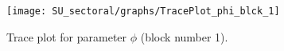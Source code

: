 \begin{figure}[H]
\centering
  \texttt{[image: SU\_sectoral/graphs/TracePlot\_phi\_blck\_1]}\\
    \caption{Trace plot for parameter ${\phi}$ (block number 1).}
\end{figure}

